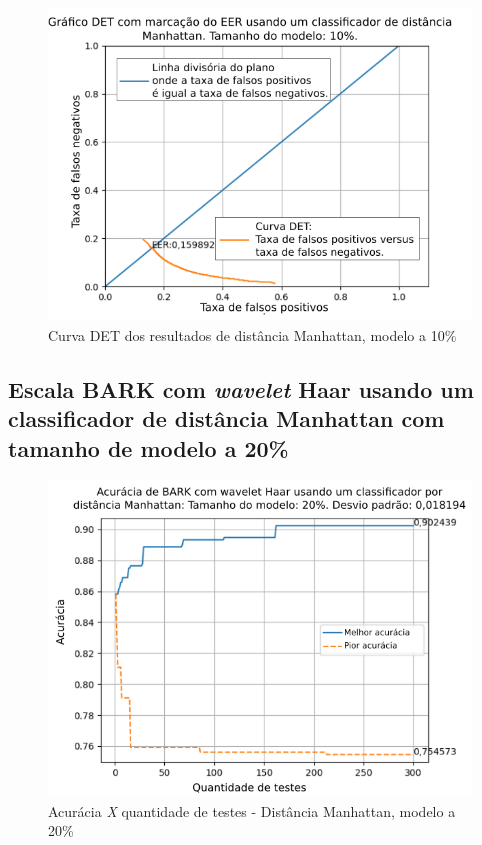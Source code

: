 \begin{figure}[!ht]
	\centering
	\includegraphics[width=\linewidth]{images/results/det/DET_for_classifier_Manhattan_10}
	\caption{Curva DET dos resultados de distância Manhattan, modelo a 10\%}
	\label{fig:detforclassifiermanhattan10}
\end{figure}

\subsection{Escala BARK com \textit{wavelet} Haar usando um classificador de distância Manhattan com tamanho de modelo a 20\%}



\begin{figure}[!ht]
	\centering
	\includegraphics[width=\linewidth]{images/results/confusionMatrices/classifier_Manhattan_20.png}
	\caption{Acurácia \textit{X} quantidade de testes - Distância Manhattan, modelo a 20\%}
	\label{fig:classifiermanhattan20}
\end{figure}

